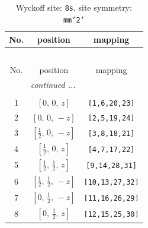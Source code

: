 \documentclass[fleqn,8pt]{jsarticle}
\begin{document}
\begin{longtable}{ccc}
\caption{Wyckoff site: {\tt 8s}, site symmetry: {\tt mm'2'}}
 \\
 \hline \hline
No. & position & mapping \\ \hline \endfirsthead

\multicolumn{2}{l}{\tablename\ \thetable{}} \\
 \hline \hline
No. & position & mapping \\ \hline \endhead

 \hline \hline
\multicolumn{2}{r}{\footnotesize\it continued ...} \\ \endfoot

 \hline \hline
\multicolumn{2}{r}{} \\ \endlastfoot

1 & $\left[ 0,\, 0,\, z \right]$ & {\tt [1,6,20,23]} \\ \hline
2 & $\left[ 0,\, 0,\, - z \right]$ & {\tt [2,5,19,24]} \\ \hline
3 & $\left[ \frac{1}{2},\, 0,\, - z \right]$ & {\tt [3,8,18,21]} \\ \hline
4 & $\left[ \frac{1}{2},\, 0,\, z \right]$ & {\tt [4,7,17,22]} \\ \hline
5 & $\left[ \frac{1}{2},\, \frac{1}{2},\, z \right]$ & {\tt [9,14,28,31]} \\ \hline
6 & $\left[ \frac{1}{2},\, \frac{1}{2},\, - z \right]$ & {\tt [10,13,27,32]} \\ \hline
7 & $\left[ 0,\, \frac{1}{2},\, - z \right]$ & {\tt [11,16,26,29]} \\ \hline
8 & $\left[ 0,\, \frac{1}{2},\, z \right]$ & {\tt [12,15,25,30]} \\
\end{longtable}
\renewcommand{\arraystretch}{1.2}
\end{document}
